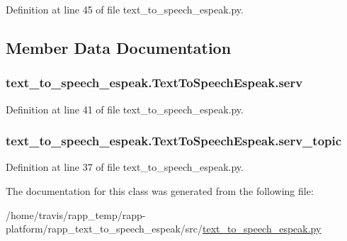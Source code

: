 Definition at line 45 of file text\-\_\-to\-\_\-speech\-\_\-espeak.\-py.



\subsection{Member Data Documentation}
\hypertarget{classtext__to__speech__espeak_1_1TextToSpeechEspeak_a2d7125fa374df3f2464895e9912740e1}{
\subsubsection[{serv}]{\setlength{\rightskip}{0pt plus 5cm}text\-\_\-to\-\_\-speech\-\_\-espeak.\-Text\-To\-Speech\-Espeak.\-serv}}\label{classtext__to__speech__espeak_1_1TextToSpeechEspeak_a2d7125fa374df3f2464895e9912740e1}


Definition at line 41 of file text\-\_\-to\-\_\-speech\-\_\-espeak.\-py.

\hypertarget{classtext__to__speech__espeak_1_1TextToSpeechEspeak_a90fad6605bb18dd67187858f7389bf13}{
\subsubsection[{serv\-\_\-topic}]{\setlength{\rightskip}{0pt plus 5cm}text\-\_\-to\-\_\-speech\-\_\-espeak.\-Text\-To\-Speech\-Espeak.\-serv\-\_\-topic}}\label{classtext__to__speech__espeak_1_1TextToSpeechEspeak_a90fad6605bb18dd67187858f7389bf13}


Definition at line 37 of file text\-\_\-to\-\_\-speech\-\_\-espeak.\-py.



The documentation for this class was generated from the following file\-:\begin{DoxyCompactItemize}
\item 
/home/travis/rapp\-\_\-temp/rapp-\/platform/rapp\-\_\-text\-\_\-to\-\_\-speech\-\_\-espeak/src/\hyperlink{text__to__speech__espeak_8py}{text\-\_\-to\-\_\-speech\-\_\-espeak.\-py}\end{DoxyCompactItemize}
